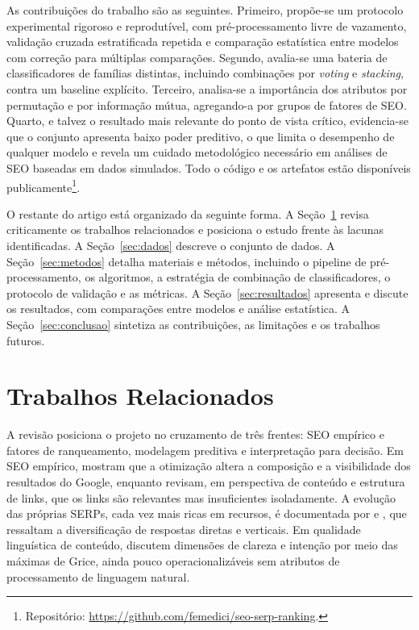 \documentclass[12pt]{article}
\begin{document}
As contribuições do trabalho são as seguintes. Primeiro, propõe-se um protocolo experimental
rigoroso e reprodutível, com pré-processamento livre de vazamento, validação cruzada
estratificada repetida e comparação estatística entre modelos com correção para múltiplas
comparações. Segundo, avalia-se uma bateria de classificadores de famílias distintas, incluindo
combinações por \textit{voting} e \textit{stacking}, contra um baseline explícito. Terceiro,
analisa-se a importância dos atributos por permutação e por informação mútua, agregando-a por
grupos de fatores de SEO. Quarto, e talvez o resultado mais relevante do ponto de vista crítico,
evidencia-se que o conjunto apresenta baixo poder preditivo, o que limita o desempenho de
qualquer modelo e revela um cuidado metodológico necessário em análises de SEO baseadas em dados
simulados. Todo o código e os artefatos estão disponíveis publicamente\footnote{Repositório:
\url{https://github.com/femedici/seo-serp-ranking}.}.

O restante do artigo está organizado da seguinte forma. A Seção~\ref{sec:relacionados} revisa
criticamente os trabalhos relacionados e posiciona o estudo frente às lacunas identificadas. A
Seção~\ref{sec:dados} descreve o conjunto de dados. A Seção~\ref{sec:metodos} detalha materiais e
métodos, incluindo o pipeline de pré-processamento, os algoritmos, a estratégia de combinação de
classificadores, o protocolo de validação e as métricas. A Seção~\ref{sec:resultados} apresenta e
discute os resultados, com comparações entre modelos e análise estatística. A
Seção~\ref{sec:conclusao} sintetiza as contribuições, as limitações e os trabalhos futuros.

\section{Trabalhos Relacionados}
\label{sec:relacionados}

A revisão posiciona o projeto no cruzamento de três frentes: SEO empírico e fatores de
ranqueamento, modelagem preditiva e interpretação para decisão. Em SEO empírico,
\cite{lewandowski2021} mostram que a otimização altera a composição e a visibilidade dos
resultados do Google, enquanto \cite{ali2021} revisam, em perspectiva de conteúdo e estrutura de
links, que os links são relevantes mas insuficientes isoladamente. A evolução das próprias SERPs,
cada vez mais ricas em recursos, é documentada por \cite{duka2023} e \cite{oliveira2023}, que
ressaltam a diversificação de respostas diretas e verticais. Em qualidade linguística de
conteúdo, \cite{cirakoglu2024} discutem dimensões de clareza e intenção por meio das máximas de
Grice, ainda pouco operacionalizáveis sem atributos de processamento de linguagem natural.
\end{document}
